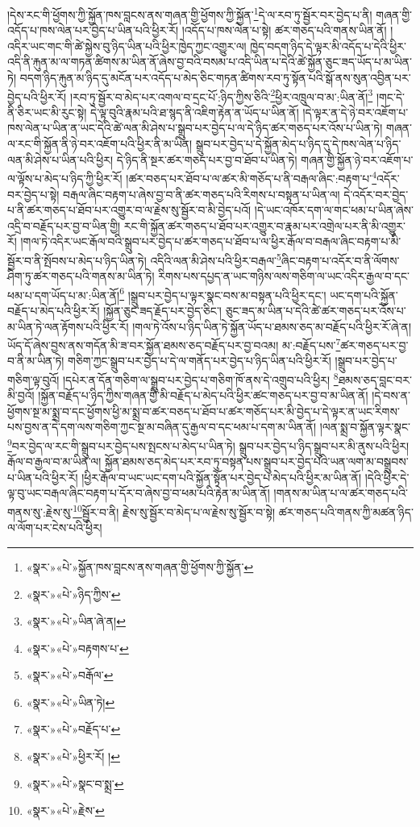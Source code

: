 །དེས་རང་གི་ཕྱོགས་ཀྱི་སྐྱོན་ཁས་བླངས་ནས་གཞན་གྱི་ཕྱོགས་ཀྱི་སྐྱོན་\footnote{«སྣར་»«པེ་»སྐྱོན་ཁས་བླངས་ནས་གཞན་གྱི་ཕྱོགས་ཀྱི་སྐྱོན་}དེ་ལ་རབ་ཏུ་སྦྱོར་བར་བྱེད་པ་ནི། གཞན་གྱི་འདོད་པ་ཁས་ལེན་པར་བྱེད་པ་ཡིན་པའི་ཕྱིར་རོ། །འདོད་པ་ཁས་ལེན་པ་སྟེ། ཚར་གཅད་པའི་གནས་ཡིན་ནོ། །འདིར་ཡང་གང་གི་ཚེ་སྐྱེས་བུ་ཉིད་ཡིན་པའི་ཕྱིར་ཁྱེད་ཀྱང་འགྱུར་ལ། ཁྱེད་བདག་ཉིད་དེ་ལྟར་མི་འདོད་པ་དེའི་ཕྱིར་འདི་ནི་རྐུན་མ་ལ་གཏན་ཚིགས་མ་ཡིན་ནོ་ཞེས་བྱ་བའི་བསམ་པ་འདི་ཡིན་པ་དེའི་ཚེ་སྐྱོན་ཅུང་ཟད་ཡོད་པ་མ་ཡིན་ཏེ། བདག་ཉིད་རྐུན་མ་ཉིད་དུ་མངོན་པར་འདོད་པ་མེད་ཅིང་གཏན་ཚིགས་རབ་ཏུ་སྟོན་པའི་སྒོ་ནས་སུན་འབྱིན་པར་བྱེད་པའི་ཕྱིར་རོ། །རབ་ཏུ་སྦྱོར་བ་མེད་པར་འགལ་བ་དྲང་པོ་:ཉིད་ཀྱིས་ཅིའི་\footnote{«སྣར་»«པེ་»ཉིད་ཀྱིས་}ཕྱིར་འཁྲུལ་བ་མ་:ཡིན་ནོ།\footnote{«སྣར་»«པེ་»ཡིན་ཞེ་ན།} །གང་དེ་ནི་ཅིར་ཡང་མི་རུང་སྟེ། དེ་ལྟ་བུའི་རྣམ་པའི་ཐ་སྙད་ནི་འཇིག་རྟེན་ན་ཡོད་པ་ཡིན་ནོ། །དེ་ལྟར་ན་དེ་ཉེ་བར་འཇོག་པ་ཁས་ལེན་པ་ཡིན་ན་ཡང་དེའི་ཚེ་ལན་མི་ཤེས་པ་སྒྲུབ་པར་བྱེད་པ་ལ་དེ་ཉིད་ཚར་གཅད་པར་འོས་པ་ཡིན་ཏེ། གཞན་ལ་རང་གི་སྐྱོན་ནི་ཉེ་བར་འཇོག་པའི་ཕྱིར་ནི་མ་ཡིན། སྒྲུབ་པར་བྱེད་པ་དེ་སྐྱོན་མེད་པ་ཉིད་དུ་དེ་ཁས་ལེན་པ་ཉིད་ལན་མི་ཤེས་པ་ཡིན་པའི་ཕྱིར། དེ་ཉིད་ནི་སྔར་ཚར་གཅད་པར་བྱ་བ་ཐོབ་པ་ཡིན་ཏེ། གཞན་གྱི་སྐྱོན་ཉེ་བར་འཇོག་པ་ལ་ལྟོས་པ་མེད་པ་ཉིད་ཀྱི་ཕྱིར་རོ། །ཚར་བཅད་པར་ཐོབ་པ་ལ་ཚར་མི་གཅོད་པ་ནི་བརྒལ་ཞིང་:བརྟག་པ་\footnote{«སྣར་»«པེ་»བརྟགས་པ་}འདོར་བར་བྱེད་པ་སྟེ། བརྒལ་ཞིང་བརྟག་པ་ཞེས་བྱ་བ་ནི་ཚར་གཅད་པའི་རིགས་པ་བསྟན་པ་ཡིན་ལ། དེ་འདོར་བར་བྱེད་པ་ནི་ཚར་གཅད་པ་ཐོབ་པར་འགྱུར་བ་ལ་རྗེས་སུ་སྦྱོར་བ་མི་བྱེད་པའོ། །དེ་ཡང་འཁོར་དག་ལ་གང་ཕམ་པ་ཡིན་ཞེས་འདྲི་བ་བརྗོད་པར་བྱ་བ་ཡིན་གྱི། རང་གི་སྐྱོན་ཚར་གཅད་པ་ཐོབ་པར་འགྱུར་བ་རྣམ་པར་འགྲེལ་པར་ནི་མི་འགྱུར་རོ། །གལ་ཏེ་འདིར་ཡང་རྒོལ་བའི་སྒྲུབ་པར་བྱེད་པ་ཚར་གཅད་པ་ཐོབ་པ་ལ་ཕྱིར་རྒོལ་བ་བརྒལ་ཞིང་བརྟག་པ་མི་སྦྱོར་བ་ནི་སྤོབས་པ་མེད་པ་ཉིད་ཡིན་ཏེ། འདིའི་ལན་མི་ཤེས་པའི་ཕྱིར་བརྒལ་\footnote{«སྣར་»«པེ་»བརྒོལ་}ཞིང་བརྟག་པ་འདོར་བ་ནི་ལོགས་ཤིག་ཏུ་ཚར་གཅད་པའི་གནས་མ་ཡིན་ཏེ། རིགས་པས་དཔྱད་ན་ཡང་གཉིས་ལས་གཅིག་ལ་ཡང་འདིར་རྒྱལ་བ་དང་ཕམ་པ་དག་ཡོད་པ་མ་:ཡིན་ནོ།\footnote{«སྣར་»«པེ་»ཡིན་ཏེ།} །སྒྲུབ་པར་བྱེད་པ་ལྟར་སྣང་བས་མ་བསྟན་པའི་ཕྱིར་དང་། ཡང་དག་པའི་སྐྱོན་བརྗོད་པ་མེད་པའི་ཕྱིར་རོ། །སྐྱོན་ཅུང་ཟད་རྗོད་པར་བྱེད་ཅིང་། ཅུང་ཟད་མ་ཡིན་པ་དེའི་ཚེ་ཚར་གཅད་པར་འོས་པ་མ་ཡིན་ཏེ་ལན་རྟོགས་པའི་ཕྱིར་རོ། །གལ་ཏེ་འོས་པ་ཉིད་ཡིན་ཏེ་སྐྱོན་ཡོད་པ་ཐམས་ཅད་མ་བརྗོད་པའི་ཕྱིར་རོ་ཞེ་ན། ཡོད་དོ་ཞེས་བྱས་ནས་གདོན་མི་ཟ་བར་སྐྱོན་ཐམས་ཅད་བརྗོད་པར་བྱ་བའམ། མ་:བརྗོད་པས་\footnote{«སྣར་»«པེ་»བརྗོད་པ་}ཚར་གཅད་པར་བྱ་བ་ནི་མ་ཡིན་ཏེ། གཅིག་ཀྱང་སྒྲུབ་པར་བྱེད་པ་དེ་ལ་གནོད་པར་བྱེད་པ་ཉིད་ཡིན་པའི་ཕྱིར་རོ། །སྒྲུབ་པར་བྱེད་པ་གཅིག་ལྟ་བུའོ། །དཔེར་ན་དོན་གཅིག་ལ་སྒྲུབ་པར་བྱེད་པ་གཅིག་ཁོ་ནས་དེ་འགྲུབ་པའི་ཕྱིར། \footnote{«སྣར་»«པེ་»ཕྱིར་རོ། ། }ཐམས་ཅད་བླང་བར་མི་བྱའོ། །སྐྱོན་བརྗོད་པ་ཉིད་ཀྱིས་གཞན་གྱི་མི་བརྗོད་པ་མེད་པའི་ཕྱིར་ཚང་གཅད་པར་བྱ་བ་མ་ཡིན་ནོ། །དེ་བས་ན་ཕྱོགས་སྔ་མ་སྨྲ་བ་དང་ཕྱོགས་ཕྱི་མ་སྨྲ་བ་ཚར་བཅད་པ་ཐོབ་པ་ཚར་གཅོད་པར་མི་བྱེད་པ་དེ་ལྟར་ན་ཡང་རིགས་པས་བྱས་ན་དེ་དག་ལས་གཅིག་ཀྱང་སྔ་མ་བཞིན་དུ་རྒྱལ་བ་དང་ཕམ་པ་དག་མ་ཡིན་ནོ། །ལན་སྨྲ་བ་སྐྱོན་ལྟར་སྣང་\footnote{«སྣར་»«པེ་»སྣང་བ་སྨྲ་}བར་བྱེད་ལ་རང་གི་སྒྲུབ་པར་བྱེད་པས་སྤངས་པ་མེད་པ་ཡིན་ཏེ། སྒྲུབ་པར་བྱེད་པ་ཉིད་སྒྲུབ་པར་མི་ནུས་པའི་ཕྱིར། རྒོལ་བ་རྒྱལ་བ་མ་ཡིན་ལ། སྐྱོན་ཐམས་ཅད་མེད་པར་རབ་ཏུ་བསྟན་པས་སྒྲུབ་པར་བྱེད་པའི་ཡན་ལག་མ་བསྒྲུབས་པ་ཡིན་པའི་ཕྱིར་རོ། །ཕྱིར་རྒོལ་བ་ཡང་ཡང་དག་པའི་སྐྱོན་སྟོན་པར་བྱེད་པ་མེད་པའི་ཕྱིར་མ་ཡིན་ནོ། །དེའི་ཕྱིར་དེ་ལྟ་བུ་ཡང་བརྒལ་ཞིང་བརྟག་པ་དོར་བ་ཞེས་བྱ་བ་ཕམ་པའི་རྟེན་མ་ཡིན་ནོ། །གནས་མ་ཡིན་པ་ལ་ཚར་གཅད་པའི་གནས་སུ་:རྗེས་སུ་\footnote{«སྣར་»«པེ་»རྗེས་}སྦྱོར་བ་ནི། རྗེས་སུ་སྦྱོར་བ་མེད་པ་ལ་རྗེས་སུ་སྦྱོར་བ་སྟེ། ཚར་གཅད་པའི་གནས་ཀྱི་མཚན་ཉིད་ལ་ལོག་པར་ངེས་པའི་ཕྱིར། 